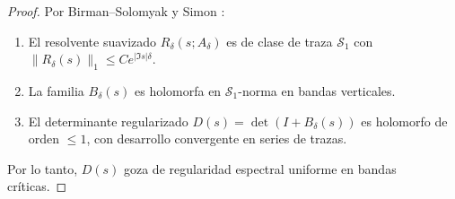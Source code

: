 \begin{proof}
Por Birman–Solomyak \cite{BirmanSolomyak1977} y Simon \cite{SimonTraceIdeals2005}:
\begin{enumerate}
\item El resolvente suavizado $R_\delta(s; A_\delta)$ es de clase de traza $\mathcal{S}_1$ 
   con $\|R_\delta(s)\|_1 \le C e^{|\Im s|\delta}$.
\item La familia $B_\delta(s)$ es holomorfa en $\mathcal{S}_1$-norma en bandas verticales.
\item El determinante regularizado $D(s) = \det(I+B_\delta(s))$ es holomorfo de orden $\le 1$,
   con desarrollo convergente en series de trazas.
\end{enumerate}
Por lo tanto, $D(s)$ goza de regularidad espectral uniforme en bandas críticas.
\end{proof}
